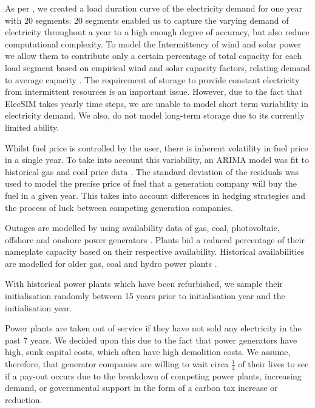 As per \cite{Chappin2017}, we created a load duration curve of the electricity demand for one year with 20 segments. 20 segments enabled us to capture the varying demand of electricity throughout a year to a high enough degree of accuracy, but also reduce computational complexity. To model the Intermittency of wind and solar power we allow them to contribute only a certain percentage of total capacity for each load segment based on empirical wind and solar capacity factors, relating demand to average capacity \cite{Pfenninger2016, Staffell2016, Chappin2017}. The requirement of storage to provide constant electricity from intermittent resources is an important issue. However, due to the fact that ElecSIM takes yearly time steps, we are unable to model short term variability in electricity demand. We also, do not model long-term storage due to its currently limited ability. 

Whilst fuel price is controlled by the user, there is inherent volatility in fuel price in a single year. To take into account this variability, an ARIMA model was fit to historical gas and coal price data \cite{coalprices,gasprices}. The standard deviation of the residuals was used to model the precise price of fuel that a generation company will buy the fuel in a given year. This takes into account differences in hedging strategies and the process of luck between competing generation companies.

Outages are modelled by using availability data of gas, coal, photovoltaic, offshore and onshore power generators \cite{Ltd2016, Hunt2015, carroll-j}. Plants bid a reduced percentage of their nameplate capacity based on their respective availability. Historical availabilities are modelled for older gas, coal and hydro power plants \cite{AlbertaSystemElectricOperator2016}.

With historical power plants which have been refurbished, we sample their initialisation randomly between 15 years prior to initialisation year and the initialisation year.

Power plants are taken out of service if they have not sold any electricity in the past 7 years. We decided upon this due to the fact that power generators have high, sunk capital costs, which often have high demolition costs. We assume, therefore, that generator companies are willing to wait circa $\frac{1}{4}$ of their lives to see if a pay-out occurs due to the breakdown of competing power plants, increasing demand, or governmental support in the form of a carbon tax increase or reduction.


